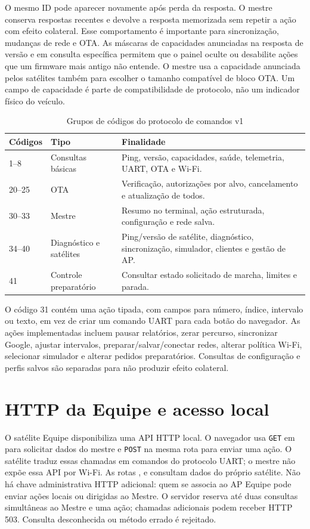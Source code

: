 O mesmo ID pode aparecer novamente após perda da resposta. O mestre conserva respostas recentes e devolve a resposta memorizada sem repetir a ação com efeito colateral. Esse comportamento é importante para sincronização, mudanças de rede e OTA. As máscaras de capacidades anunciadas na resposta de versão e em consulta específica permitem que o painel oculte ou desabilite ações que um firmware mais antigo não entende. O mestre usa a capacidade anunciada pelos satélites também para escolher o tamanho compatível de bloco OTA. Um campo de capacidade é parte de compatibilidade de protocolo, não um indicador físico do veículo.

\begin{table}[htbp]\centering\small
\caption{Grupos de códigos do protocolo de comandos v1}\label{tab:codigos-comandos}
\begin{tabularx}{\textwidth}{@{}l l X@{}}\toprule
Códigos & Tipo & Finalidade\\\midrule
1--8 & Consultas básicas & Ping, versão, capacidades, saúde, telemetria, UART, OTA e Wi-Fi.\\
20--25 & OTA & Verificação, autorizações por alvo, cancelamento e atualização de todos.\\
30--33 & Mestre & Resumo no terminal, ação estruturada, configuração e rede salva.\\
34--40 & Diagnóstico e satélites & Ping/versão de satélite, diagnóstico, sincronização, simulador, clientes e gestão de AP.\\
41 & Controle preparatório & Consultar estado solicitado de marcha, limites e parada.\\\bottomrule
\end{tabularx}\end{table}

O código 31 contém uma ação tipada, com campos para número, índice, intervalo ou texto, em vez de criar um comando UART para cada botão do navegador. As ações implementadas incluem pausar relatórios, zerar percurso, sincronizar Google, ajustar intervalos, preparar/salvar/conectar redes, alterar política Wi-Fi, selecionar simulador e alterar pedidos preparatórios. Consultas de configuração e perfis salvos são separadas para não produzir efeito colateral.

\section{HTTP da Equipe e acesso local}
O satélite Equipe disponibiliza uma API HTTP local. O navegador usa \texttt{GET} em  para solicitar dados do mestre e \texttt{POST} na mesma rota para enviar uma ação. O satélite traduz essas chamadas em comandos do protocolo UART; o mestre não expõe essa API por Wi-Fi. As rotas ,  e  consultam dados do próprio satélite. Não há chave administrativa HTTP adicional: quem se associa ao AP Equipe pode enviar ações locais ou dirigidas ao Mestre. O servidor reserva até duas consultas simultâneas ao Mestre e uma ação; chamadas adicionais podem receber HTTP 503. Consulta desconhecida ou método errado é rejeitado.

